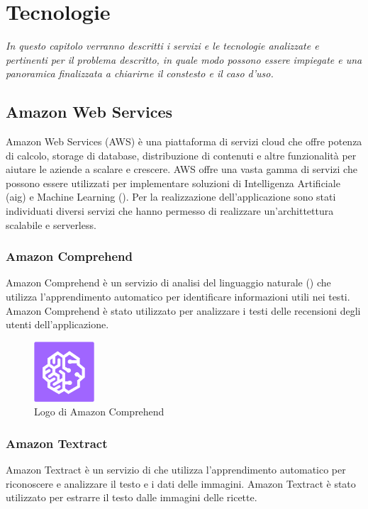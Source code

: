 \chapter{Tecnologie}
\label{cap:tecnologie}
\emph{In questo capitolo verranno descritti i servizi e le tecnologie analizzate e pertinenti per il problema descritto, in quale modo possono essere impiegate e una panoramica finalizzata a chiarirne il constesto e il caso d'uso.}

\section{Amazon Web Services}
Amazon Web Services (AWS) è una piattaforma di servizi cloud che offre potenza di calcolo, storage di database, distribuzione di contenuti e altre funzionalità per aiutare le aziende a scalare e crescere. AWS offre una vasta gamma di servizi che possono essere utilizzati per implementare soluzioni di Intelligenza Artificiale ({\gls{aig}}) e Machine Learning (). Per la realizzazione dell'applicazione sono stati individuati diversi servizi che hanno permesso di realizzare un'archittettura scalabile e serverless. 

\subsection{Amazon Comprehend}
Amazon Comprehend è un servizio di analisi del linguaggio naturale () che utilizza l'apprendimento automatico per identificare informazioni utili nei testi. Amazon Comprehend è stato utilizzato per analizzare i testi delle recensioni degli utenti dell'applicazione.

\begin{figure}[h]
  \centering
  \includegraphics[width=0.2\textwidth]{img/tecnologie/comprehend.png}
  \caption{Logo di Amazon Comprehend}
  \label{fig:comprehend}
\end{figure}

\subsection{Amazon Textract}
Amazon Textract è un servizio di  che utilizza l'apprendimento automatico per riconoscere e analizzare il testo e i dati delle immagini. Amazon Textract è stato utilizzato per estrarre il testo dalle immagini delle ricette.


